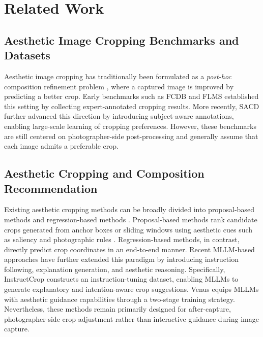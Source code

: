 \documentclass{llmxive}
\begin{document}
\section{Related Work}

\subsection{Aesthetic Image Cropping Benchmarks and Datasets}

Aesthetic image cropping has traditionally been formulated as a \emph{post-hoc} composition refinement problem \citep{yan2013learning,hong2024learning,yang2023focusing,zeng2019reliable,wei2018good,chen2017quantitative,fang2014automatic,zhang2022human}, where a captured image is improved by predicting a better crop. Early benchmarks such as FCDB \citep{chen2017quantitative} and FLMS \citep{fang2014automatic} established this setting by collecting expert-annotated cropping results. More recently, SACD \citep{zhang2022human} further advanced this direction by introducing subject-aware annotations, enabling large-scale learning of cropping preferences. However, these benchmarks are still centered on photographer-side post-processing and generally assume that each image admits a preferable crop.

\subsection{Aesthetic Cropping and Composition Recommendation}

Existing aesthetic cropping methods can be broadly divided into proposal-based methods \citep{su2024spatial,zeng2019reliable,zhang2026procrop} and regression-based methods \citep{hong2021composing,huang2024multi,pan2021robust,du2026venus,sheng2025instructcrop}. Proposal-based methods rank candidate crops generated from anchor boxes or sliding windows using aesthetic cues such as saliency and photographic rules \citep{ni2013learning,fang2014automatic,zeng2019reliable}. Regression-based methods, in contrast, directly predict crop coordinates in an end-to-end manner. Recent MLLM-based approaches have further extended this paradigm by introducing instruction following, explanation generation, and aesthetic reasoning. Specifically, InstructCrop \citep{sheng2025instructcrop} constructs an instruction-tuning dataset, enabling MLLMs to generate explanatory and intention-aware crop suggestions. Venus \citep{du2026venus} equips MLLMs with aesthetic guidance capabilities through a two-stage training strategy. Nevertheless, these methods remain primarily designed for after-capture, photographer-side crop adjustment rather than interactive guidance during image capture.
\end{document}
